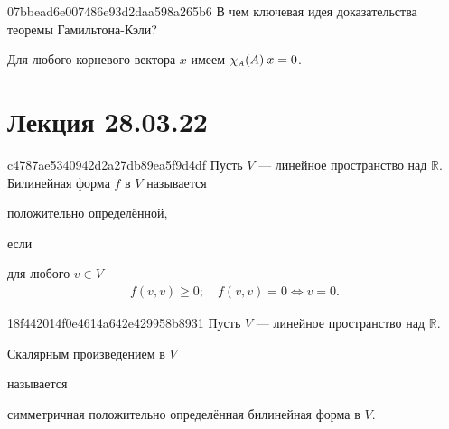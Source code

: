 
\begin{note}{07bbead6e007486e93d2daa598a265b6}
    В чем ключевая идея доказательства теоремы Гамильтона-Кэли?

    \begin{cloze}{1}
        Для любого корневого вектора \({ x }\) имеем \({ \chi_{\text{\tiny $A$}}(A) \: x = 0 }\).
    \end{cloze}
\end{note}

\section{Лекция 28.03.22}
\begin{note}{c4787ae5340942d2a27db89ea5f9d4df}
    Пусть \({ V }\) --- линейное пространство над \({ \mathbb R }\).
    Билинейная форма \({ f }\) в \({ V }\) называется \begin{icloze}{2}положительно определённой,\end{icloze} если \begin{icloze}{1}для любого \({ v \in V }\)
    \[
        \begin{gathered}
            f(v, v) \geqslant 0; \quad f(v, v) = 0 \iff v = 0.
        \end{gathered}
    \]\end{icloze}
\end{note}

\begin{note}{18f442014f0e4614a642e429958b8931}
    Пусть \({ V }\) --- линейное пространство над \({ \mathbb R }\).
    \begin{icloze}{2}Скалярным произведением в \({ V }\)\end{icloze} называется \begin{icloze}{1}симметричная положительно определённая билинейная форма в \({ V }\).\end{icloze}
\end{note}

